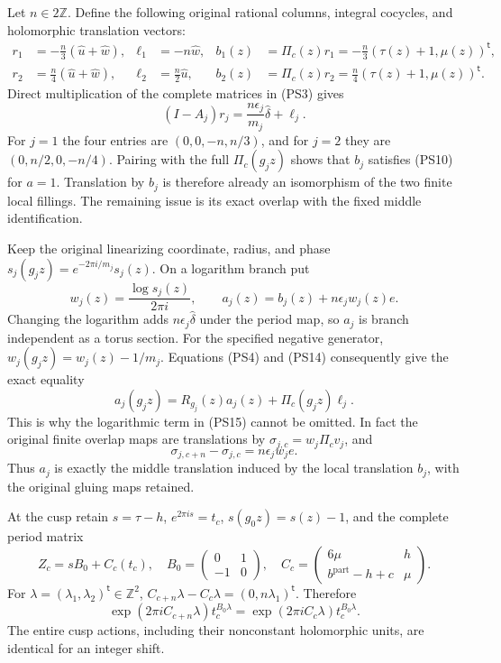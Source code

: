 Let $n\in2\mathbb Z$. Define the following original rational columns,
integral cocycles, and holomorphic translation vectors:
\[
\begin{aligned}
 r_1&=-\frac n3(\widehat u+\widehat w),&
 \ell_1&=-n\widehat w,&
 b_1(z)&=\Pi_c(z)r_1=-\frac n3(\tau(z)+1,\mu(z))^{\mathsf t},\\
 r_2&= \frac n4(\widehat u+\widehat w),&
 \ell_2&=\frac n2\widehat u,&
 b_2(z)&=\Pi_c(z)r_2=\frac n4(\tau(z)+1,\mu(z))^{\mathsf t}.
\end{aligned}
\tag{PS13}\label{pshift:eq:local-corrections}
\]
Direct multiplication of the complete matrices in (PS3) gives
\[
 (I-A_j)r_j=\frac{n\epsilon_j}{m_j}\widehat\delta+\ell_j.
 \tag{PS14}\label{pshift:eq:local-matrix-identity}
\]
For $j=1$ the four entries are $(0,0,-n,n/3)$, and for $j=2$
they are $(0,n/2,0,-n/4)$. Pairing with the full $\Pi_c(g_jz)$
shows that $b_j$ satisfies (PS10) for $a=1$.
Translation by $b_j$ is therefore already an isomorphism of the
two finite local fillings. The remaining issue is its exact overlap
with the fixed middle identification.

Keep the original linearizing coordinate, radius, and phase
$s_j(g_jz)=e^{-2\pi i/m_j}s_j(z)$. On a logarithm branch put
\[
 w_j(z)=\frac{\log s_j(z)}{2\pi i},\qquad
 a_j(z)=b_j(z)+n\epsilon_j w_j(z)e.
 \tag{PS15}\label{pshift:eq:finite-middle-sections}
\]
Changing the logarithm adds $n\epsilon_j\widehat\delta$ under the
period map, so $a_j$ is branch independent as a torus section.
For the specified negative generator, $w_j(g_jz)=w_j(z)-1/m_j$.
Equations (PS4) and (PS14) consequently give the exact equality
\[
 a_j(g_jz)=R_{g_j}(z)a_j(z)+\Pi_c(g_jz)\ell_j.
 \tag{PS16}\label{pshift:eq:local-affine-cocycle}
\]
This is why the logarithmic term in (PS15) cannot be omitted.
In fact the original finite overlap maps are translations by
$\sigma_{j,c}=w_j\Pi_c v_j$, and
\[
                  \sigma_{j,c+n}-\sigma_{j,c}
                     =n\epsilon_jw_je.
 \tag{PS17}\label{pshift:eq:actual-overlap-difference}
\]
Thus $a_j$ is exactly the middle translation induced by the local
translation $b_j$, with the original gluing maps retained.

At the cusp retain $s=\tau-h$, $e^{2\pi is}=t_c$, $s(g_0z)=s(z)-1$,
and the complete period matrix
\[
 Z_c=sB_0+C_c(t_c),\quad
 B_0=\begin{pmatrix}0&1\\-1&0\end{pmatrix},\quad
 C_c=\begin{pmatrix}6\mu&h\\ b^{\mathrm{part}}-h+c&\mu\end{pmatrix}.
 \tag{PS18}\label{pshift:eq:cusp-periods}
\]
For $\lambda=(\lambda_1,\lambda_2)^{\mathsf t}\in\mathbb Z^2$,
$C_{c+n}\lambda-C_c\lambda=(0,n\lambda_1)^{\mathsf t}$. Therefore
\[
 \exp(2\pi iC_{c+n}\lambda)t_c^{B_0\lambda}
       =\exp(2\pi iC_c\lambda)t_c^{B_0\lambda}.
 \tag{PS19}\label{pshift:eq:cusp-actions-identical}
\]
The entire cusp actions, including their nonconstant holomorphic units,
are identical for an integer shift.

